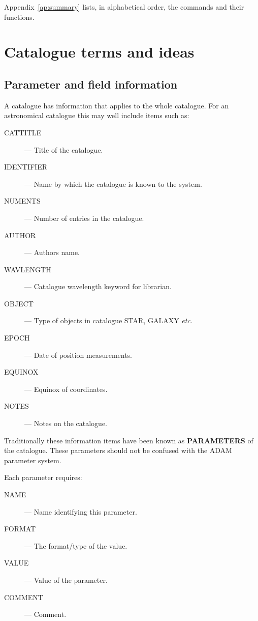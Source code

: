 Appendix~\ref{ap:summary} lists, in alphabetical order, the commands and 
their functions.

\section {Catalogue terms and ideas}

\subsection {Parameter and field information}

A catalogue has information that applies to the  whole catalogue. For an
astronomical catalogue this may well include items such as:
 
\begin{description}
\begin{description}
\item [CATTITLE] --- Title of the catalogue.
\item [IDENTIFIER] --- Name by which the catalogue is known to the system.
\item [NUMENTS] --- Number of entries in the catalogue.
\item [AUTHOR] --- Authors name.
\item [WAVLENGTH] --- Catalogue wavelength keyword for librarian.
\item [OBJECT] --- Type of objects in catalogue STAR, GALAXY {\em etc}.
\item [EPOCH] --- Date of position measurements.
\item [EQUINOX] --- Equinox of coordinates.
\item [NOTES] --- Notes on the catalogue.
\end{description}
\end{description}

Traditionally these information items have been known as {\bf PARAMETERS} of 
the catalogue. These parameters should not be confused with the {\small ADAM}
parameter system.

Each parameter requires:

\begin{description}
\begin{description}
\item [NAME] --- Name identifying this parameter.
\item [FORMAT] --- The format/type of the value.
\item [VALUE] --- Value of the parameter.
\item [COMMENT] --- Comment.
\end{description}
\end{description}

